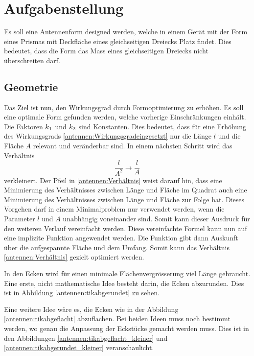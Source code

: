 %
%
% 
%
%
\section{Aufgabenstellung\label{antennen:problemstellung}}
 Es soll eine Antennenform designed werden, welche in einem Gerät mit der Form 
 eines Prismas mit Deckfläche eines gleichseitigen Dreiecks Platz findet. Dies bedeutet, dass 
 die Form das Mass eines gleichseitigen Dreiecks nicht überschreiten darf.
 
\subsection{Geometrie\label{antennen:Geom}}
Das Ziel ist nun, den Wirkungsgrad durch Formoptimierung zu erhöhen. Es soll eine optimale Form
gefunden werden, welche vorherige Einschränkungen einhält.
Die Faktoren $k\textsubscript{1}$ und $k\textsubscript{2}$ sind Konstanten. 
Dies bedeutet, dass für eine Erhöhung des Wirkungsgrads \eqref{antennen:Wirkungsgradeingesetzt} nur die Länge 
$l$ und die Fläche $A$ relevant und veränderbar sind. In einem nächsten Schritt wird das Verhältnis
\begin{equation}
	\frac{l}{A^2} \rightarrow \frac{l}{A}
	\label{antennen:Verhältnis}
\end{equation}
verkleinert. 
Der Pfeil in \eqref{antennen:Verhältnis} weist darauf hin, dass eine Minimierung des Verhältnisses zwischen Länge und Fläche im Quadrat auch eine Minimierung des Verhältnisses zwischen Länge und Fläche zur Folge hat. Dieses Vorgehen darf in einem Minimalproblem nur verwendet werden, wenn die Parameter $l$ und $A$ unabhängig voneinander sind. Somit kann dieser Ausdruck 
für den weiteren Verlauf vereinfacht werden. Diese vereinfachte Formel kann nun auf eine implizite 
Funktion angewendet werden. Die Funktion gibt dann Auskunft über die aufgespannte Fläche und 
dem Umfang. Somit kann das Verhältnis \eqref{antennen:Verhältnis} gezielt optimiert werden. 

In den Ecken wird für einen minimale Flächenvergrösserung viel Länge gebraucht.
Eine erste, nicht mathematische Idee besteht darin, die Ecken abzurunden. Dies ist in Abbildung
\ref{antennen:tikabgerundet} zu sehen. 

Eine weitere Idee wäre es, die Ecken wie in der Abbildung \ref{antennen:tikabgeflacht} abzuflachen. Bei
beiden Ideen muss noch bestimmt werden, wo genau die Anpassung der Eckstücke gemacht werden muss. Dies ist in den Abbildungen 
\ref{antennen:tikabgeflacht_kleiner} und \ref{antennen:tikabgerundet_kleiner} veranschaulicht.

